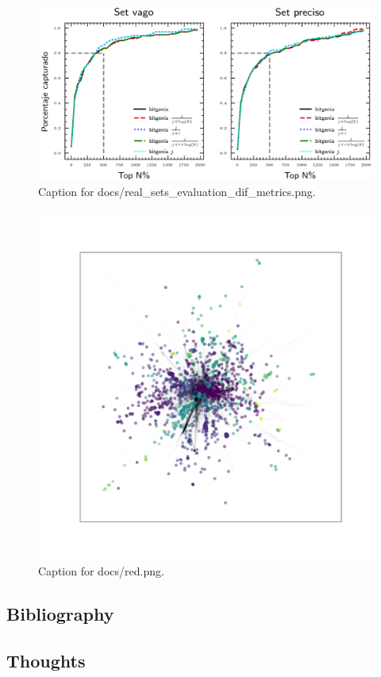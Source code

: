 \documentclass{article}
\begin{document}
\begin{figure}[h] \centering \includegraphics{docs/real_sets_evaluation_dif_metrics.png} \caption{Caption for docs/real_sets_evaluation_dif_metrics.png.} \end{figure}
\begin{figure}[h] \centering \includegraphics{docs/red.png} \caption{Caption for docs/red.png.} \end{figure}
\subsection{Bibliography}
\subsection{Thoughts}
\end{document}
